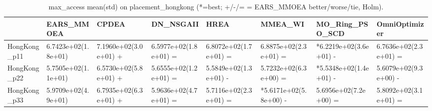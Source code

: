 \begin{table}[t]
\centering
\caption{max_access mean(std) on placement_hongkong (*=best; +/-/= = EARS_MMOEA better/worse/tie, Holm).}
\label{tab:placement_hongkong_max_access}
\begin{tabular}{llllllll}
\toprule
 & EARS\_MMOEA & CPDEA & DN\_NSGAII & HREA & MMEA\_WI & MO\_Ring\_PSO\_SCD & OmniOptimizer \\
\midrule
HongKong\_p11 & 6.7423e+02(1.8e+01) & 7.1960e+02(3.0e+01) + & 6.5977e+02(1.8e+01) = & 6.8072e+02(1.7e+01) = & 6.8875e+02(2.3e+01) = & *6.2219e+02(3.6e+01) - & 6.7636e+02(2.3e+01) = \\
HongKong\_p22 & 5.7505e+02(1.1e+01) & 6.5730e+02(5.8e+01) + & 5.6555e+02(1.2e+01) = & 5.5849e+02(1.3e+01) - & 5.7232e+02(6.3e+00) = & *5.5348e+02(1.4e+01) - & 5.6079e+02(9.3e+00) - \\
HongKong\_p33 & 5.9709e+02(4.9e+01) & 6.7935e+02(6.3e+01) + & 5.9636e+02(4.7e+01) = & 5.7116e+02(2.3e+01) = & *5.6171e+02(5.8e+00) - & 5.6956e+02(7.2e+00) = & 5.8092e+02(3.1e+01) = \\
\bottomrule
\end{tabular}
\end{table}
